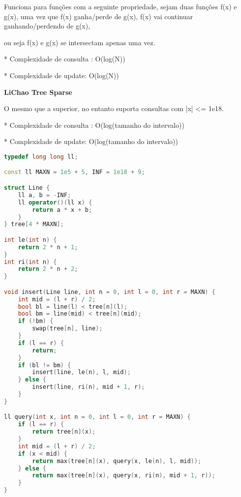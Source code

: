 \documentclass[11pt, a4paper, oneside]{book}
\begin{document}
Funciona para funções com a seguinte propriedade, sejam duas funções f(x) e g(x), uma vez que f(x) ganha/perde de g(x), f(x) vai continuar ganhando/perdendo de g(x),

ou seja f(x) e g(x) se intersectam apenas uma vez.



* Complexidade de consulta : O(log(N))

* Complexidade de update: O(log(N))



\textbf{LiChao Tree Sparse} 



O mesmo que a superior, no entanto suporta consultas com |x| <= 1e18.



* Complexidade de consulta : O(log(tamanho do intervalo))

* Complexidade de update: O(log(tamanho do intervalo))

\hfill

\begin{multicols}{2}
\begin{lstlisting}[language=C++]
typedef long long ll;

const ll MAXN = 1e5 + 5, INF = 1e18 + 9;

struct Line {
    ll a, b = -INF;
    ll operator()(ll x) {
        return a * x + b;
    }
} tree[4 * MAXN];

int le(int n) {
    return 2 * n + 1;
}
int ri(int n) {
    return 2 * n + 2;
}

void insert(Line line, int n = 0, int l = 0, int r = MAXN) {
    int mid = (l + r) / 2;
    bool bl = line(l) < tree[n](l);
    bool bm = line(mid) < tree[n](mid);
    if (!bm) {
        swap(tree[n], line);
    }
    if (l == r) {
        return;
    }
    if (bl != bm) {
        insert(line, le(n), l, mid);
    } else {
        insert(line, ri(n), mid + 1, r);
    }
}

ll query(int x, int n = 0, int l = 0, int r = MAXN) {
    if (l == r) {
        return tree[n](x);
    }
    int mid = (l + r) / 2;
    if (x < mid) {
        return max(tree[n](x), query(x, le(n), l, mid));
    } else {
        return max(tree[n](x), query(x, ri(n), mid + 1, r));
    }
}
\end{lstlisting}
\end{multicols}

\hfill
\end{document}
